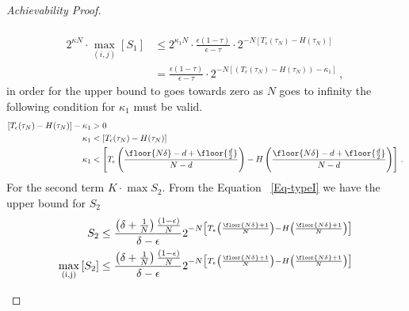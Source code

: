 \begin{proof}[Achievability Proof]
\begin{itemize}
\begin{enumerate}
\begin{align}
    \nonumber\\
      2^{\kappa N} \cdot \underset{(i,j)}{\max} \left[ S_1 \right] &\leq 2^{\kappa_1 N} \cdot \frac{\epsilon(1-\tau)}{\epsilon-\tau}\cdot 2^{-N\left[T_{\epsilon}(\tau_N) - H(\tau_N)\right]}\\
      &= \frac{\epsilon(1-\tau)}{\epsilon-\tau}\cdot 2^{-N\left[(T_{\epsilon}(\tau_N) - H(\tau_N))- \kappa_1\right]} \, , \,
\end{align}
in order for the upper bound to goes towards zero as $N$ goes to infinity the following condition for $\kappa_1$ must be valid. 
\begin{align}
\label{kappa1}
    \left[T_{\epsilon}(\tau_N) - H(\tau_N)\right]- \kappa_1 &> 0 
    \nonumber \\
    \kappa_1 &< \left[T_{\epsilon}(\tau_N) - H(\tau_N)\right]
    \nonumber \\
    \kappa_1 &< \left[T_\epsilon\left(\frac{\floor{N\delta}-d+\floor{\frac{d}{2}}}{N-d}\textbf{}\right)-H\left(\frac{\floor{N\delta}-d+\floor{\frac{d}{2}}}{N-d}\right)\right]\,.\,
\end{align}
For the second term $K\cdot \max S_2$. From the Equation ~\eqref{Eq-typeI} we have the upper bound for $S_2$
\begin{align}
 S_2 &\leq \frac{\left(\delta+\frac{1}{N}\right)\frac{(1-\epsilon)}{N}}{\delta - \epsilon} 2^{-N\left[T_\epsilon\left(\frac{\floor{N\delta}+1}{N}\right)-H\left(\frac{\floor{N\delta}+1}{N}\right)\right]} 
 \nonumber \\
 \underset{(\text{i},\text{j})}{\max} \left[ S_2 \right] &\leq \frac{\left(\delta+\frac{1}{N}\right)\frac{(1-\epsilon)}{N}}{\delta - \epsilon} 2^{-N\left[T_\epsilon\left(\frac{\floor{N\delta}+1}{N}\right)-H\left(\frac{\floor{N\delta}+1}{N}\right)\right]} 
\nonumber\\
 

\end{align}
\end{enumerate}
\end{itemize}
\end{proof}
